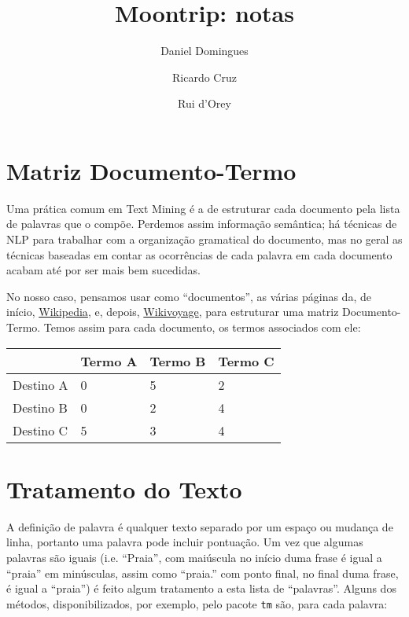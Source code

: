 \documentclass[twocolumn]{article}
\title{Moontrip: notas}
\author{Daniel Domingues\and Ricardo Cruz\and Rui d'Orey}
\begin{document}
\maketitle

\section{Matriz Documento-Termo}

Uma prática comum em Text Mining é a de estruturar cada documento pela lista de palavras que o compõe. Perdemos assim informação semântica; há técnicas de NLP para trabalhar com a organização gramatical do documento, mas no geral as técnicas baseadas em contar as ocorrências de cada palavra em cada documento acabam até por ser mais bem sucedidas.

No nosso caso, pensamos usar como ``documentos'', as várias páginas da, de início, \href{http://wikipedia.org}{Wikipedia}, e, depois, \href{http://wikivoyage.org}{Wikivoyage}, para estruturar uma matriz Documento-Termo. Temos assim para cada documento, os termos associados com ele:

\noindent
\begin{center}
\begin{tabular}{|l|l|l|l|}
\hline
	& Termo A & Termo B & Termo C \\\hline
	Destino A & 0 & 5 & 2 \\\hline
	Destino B & 0 & 2 & 4 \\\hline
	Destino C & 5 & 3 & 4 \\\hline
\end{tabular}
\end{center}

\section{Tratamento do Texto}

A definição de palavra é qualquer texto separado por um espaço ou mudança de linha, portanto uma palavra pode incluir pontuação. Um vez que algumas palavras são iguais (i.e. ``Praia'', com maiúscula no início duma frase é igual a ``praia'' em minúsculas, assim como ``praia.'' com ponto final, no final duma frase, é igual a ``praia'') é feito algum tratamento a esta lista de ``palavras''. Alguns dos métodos, disponibilizados, por exemplo, pelo pacote \texttt{tm} são, para cada palavra:
\end{document}
